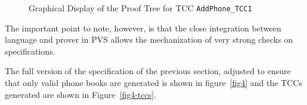 \begin{figure}[htb]
\begin{center}
\leavevmode{}\hsize{}\mbox{}
\end{center}
\caption{\label{proof-pic}Graphical Display of the Proof Tree for
TCC {\tt AddPhone\_TCC1}}
\end{figure}

The important point to note, however, is that the close integration
between language and prover in PVS allows the mechanization of very
strong checks on specifications.

The full version of the specification of the previous section,
adjusted to ensure that only valid phone books are generated is shown
in figure~\ref{fig4} and the TCCs generated are shown in
Figure~\ref{fig4-tccs}.

